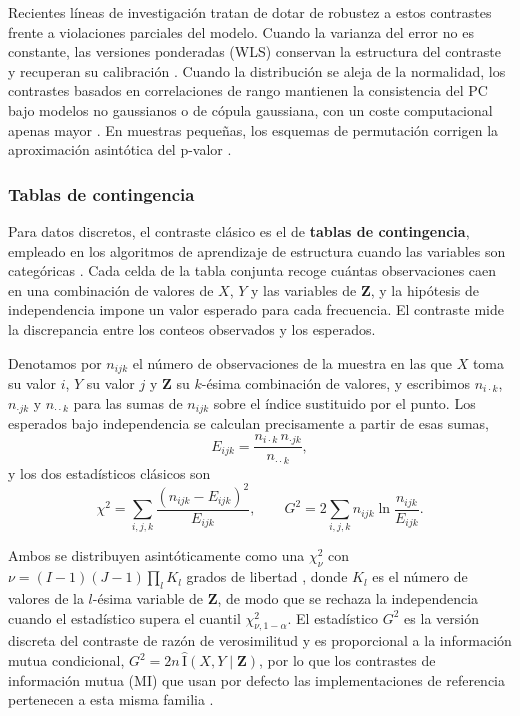 Recientes líneas de investigación tratan de dotar de robustez a estos contrastes frente a violaciones parciales del modelo. Cuando la varianza del error no es constante, las versiones ponderadas (WLS) conservan la estructura del contraste y recuperan su calibración \citep{gunther2022conditional}. Cuando la distribución se aleja de la normalidad, los contrastes basados en correlaciones de rango mantienen la consistencia del PC bajo modelos no gaussianos o de cópula gaussiana, con un coste computacional apenas mayor \citep{harris2012pcalgorithmgaussian}. En muestras pequeñas, los esquemas de permutación corrigen la aproximación asintótica del p-valor \citep{tsamardinos2010permutation}.


\subsubsection{Tablas de contingencia}            %
Para datos discretos, el contraste clásico es el de \textbf{tablas de contingencia}, empleado en los algoritmos de aprendizaje de estructura cuando las variables son categóricas \citep{kitson2023survey}. Cada celda de la tabla conjunta recoge cuántas observaciones caen en una combinación de valores de $X$, $Y$ y las variables de $\mathbf{Z}$, y la hipótesis de independencia impone un valor esperado para cada frecuencia. El contraste mide la discrepancia entre los conteos observados y los esperados.

Denotamos por $n_{ijk}$ el número de observaciones de la muestra en las que $X$ toma su valor $i$, $Y$ su valor $j$ y $\mathbf{Z}$ su $k$-ésima combinación de valores, y escribimos $n_{i\cdot k}$, $n_{\cdot jk}$ y $n_{\cdot\cdot k}$  para las sumas de $n_{ijk}$ sobre el índice sustituido por el punto. Los esperados bajo independencia se calculan precisamente a partir de esas sumas,
\[
E_{ijk} = \frac{n_{i\cdot k}\, n_{\cdot jk}}{n_{\cdot\cdot k}},
\]
y los dos estadísticos clásicos son
\[
\chi^2 = \sum_{i,j,k} \frac{(n_{ijk} - E_{ijk})^2}{E_{ijk}},
\qquad
G^2 = 2\sum_{i,j,k} n_{ijk} \ln\frac{n_{ijk}}{E_{ijk}}.
\]


Ambos se distribuyen asintóticamente como una $\chi^2_\nu$ con
$\nu = (I-1)(J-1)\prod_l K_l$ grados de libertad \citep{spirtes2000causation, kitson2023survey}, donde $K_l$ es el número de valores de la $l$-ésima variable de $\mathbf{Z}$, de modo que se rechaza la independencia cuando el estadístico supera el cuantil $\chi^2_{\nu,1-\alpha}$. El estadístico $G^2$ es la versión discreta del contraste de razón de verosimilitud y es proporcional a la información mutua condicional, $G^2 = 2n\, \hat{\mathrm{I}}(X,Y \mid \mathbf{Z})$, por lo que los
contrastes de información mutua (MI) que usan por defecto las implementaciones de referencia pertenecen a esta misma familia \citep{scutari2010bnlearn}.


